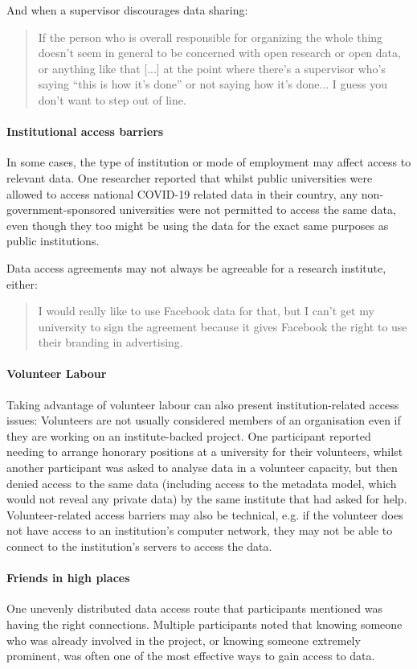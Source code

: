 \documentclass{CUP-JNL-DAP}%
\begin{document}
And when a supervisor discourages data sharing: 

\blockquote{If the person who is overall responsible for organizing the whole thing doesn't seem in general to be concerned with open research or open data, or anything like that [...] at the point where there's a supervisor who's saying \enquote{this is how it's done} or not saying how it's done... I guess you don't want to step out of line.}

\paragraph{Institutional access barriers} 
In some cases, the type of institution or mode of employment may affect access to relevant data. One researcher reported that whilst public universities were allowed to access national COVID-19 related data in their country, any non-government-sponsored universities were not permitted to access the same data, even though they too might be using the data for the exact same purposes as public institutions. 

Data access agreements may not always be agreeable for a research institute, either: 

\blockquote{I would really like to use Facebook data for that, but I can't get my university to sign the agreement because it gives Facebook the right to use their branding in advertising.}

\paragraph{Volunteer Labour} 

Taking advantage of volunteer labour can also present institution-related access issues: Volunteers are not usually considered members of an organisation even if they are working on an institute-backed project. One participant reported needing to arrange honorary positions at a university for their volunteers, whilst another participant was asked to analyse data in a volunteer capacity, but then denied access to the same data (including access to the metadata model, which would not reveal any private data) by the same institute that had asked for help. Volunteer-related access barriers may also be technical, e.g. if the volunteer does not have access to an institution's computer network, they may not be able to connect to the institution's servers to access the data.

\paragraph{Friends in high places} 
One unevenly distributed data access route that participants mentioned was having the right connections. Multiple participants noted that knowing someone who was already involved in the project, or knowing someone extremely prominent, was often one of the most effective ways to gain access to data. 
\end{document}
